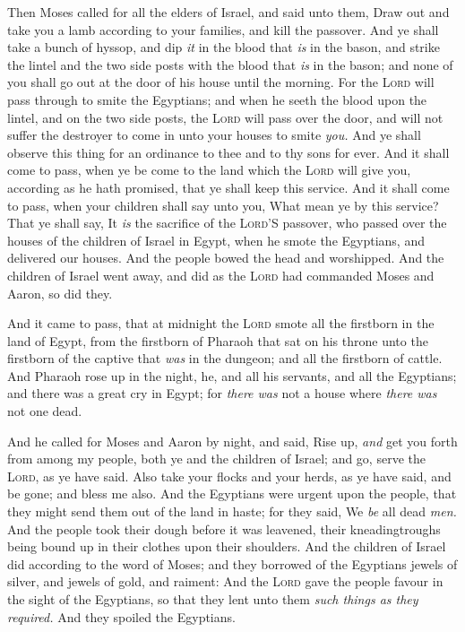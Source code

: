 \documentclass[11pt,letterpaper,oneside]{memoir}
\begin{document}
Then Moses called for all the elders of Israel, and said unto them, Draw
out and take you a lamb according to your families, and kill the
passover. And ye shall take a bunch of hyssop, and dip \emph{it} in the
blood that \emph{is} in the bason, and strike the lintel and the two
side posts with the blood that \emph{is} in the bason; and none of you
shall go out at the door of his house until the morning. For the
\textsc{Lord} will pass through to smite the Egyptians; and when he
seeth the blood upon the lintel, and on the two side posts, the
\textsc{Lord} will pass over the door, and will not suffer the destroyer
to come in unto your houses to smite \emph{you. }And ye shall observe
this thing for an ordinance to thee and to thy sons for ever. And it
shall come to pass, when ye be come to the land which the \textsc{Lord}
will give you, according as he hath promised, that ye shall keep this
service. And it shall come to pass, when your children shall say unto
you, What mean ye by this service? That ye shall say, It \emph{is} the
sacrifice of the \textsc{Lord}'S passover, who passed over the houses of
the children of Israel in Egypt, when he smote the Egyptians, and
delivered our houses. And the people bowed the head and worshipped. And
the children of Israel went away, and did as the \textsc{Lord} had
commanded Moses and Aaron, so did they.

And it came to pass, that at midnight the \textsc{Lord} smote all the
firstborn in the land of Egypt, from the firstborn of Pharaoh that sat
on his throne unto the firstborn of the captive that \emph{was} in the
dungeon; and all the firstborn of cattle. And Pharaoh rose up in the
night, he, and all his servants, and all the Egyptians; and there was a
great cry in Egypt; for \emph{there was} not a house where \emph{there
was} not one dead.

And he called for Moses and Aaron by night, and said, Rise up,
\emph{and} get you forth from among my people, both ye and the children
of Israel; and go, serve the \textsc{Lord}, as ye have said. Also take
your flocks and your herds, as ye have said, and be gone; and bless me
also. And the Egyptians were urgent upon the people, that they might
send them out of the land in haste; for they said, We \emph{be} all dead
\emph{men. }And the people took their dough before it was leavened,
their kneadingtroughs being bound up in their clothes upon their
shoulders. And the children of Israel did according to the word of
Moses; and they borrowed of the Egyptians jewels of silver, and jewels
of gold, and raiment: And the \textsc{Lord} gave the people favour in
the sight of the Egyptians, so that they lent unto them \emph{such things as
they required.} And they spoiled the Egyptians.
\end{document}
